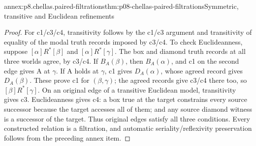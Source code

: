 \begin{annexitem}{annex:p8.chellas.paired-filtrations}{thm:p08-chellas-paired-filtrations}{Symmetric, transitive and Euclidean refinements}
\begin{proof}
For c1/c3/c4, transitivity follows by the c1/c3 argument and
transitivity of equality of the modal truth records imposed by
c3/c4. To check Euclideanness, suppose
\([\alpha]R^*[\beta]\) and \([\alpha]R^*[\gamma]\).
The box and diamond truth records at all three worlds agree, by c3/c4.
If \(B_A(\beta)\), then \(B_A(\alpha)\), and c1 on the
second edge gives A at \(\gamma\). If A holds at \(\gamma\),
c1 gives \(D_A(\alpha)\), whose agreed record gives
\(D_A(\beta)\). These prove c1 for \((\beta,\gamma)\);
the agreed records give c3/c4 there too, so
\([\beta]R^*[\gamma]\). On an original edge of a transitive
Euclidean model, transitivity gives c3. Euclideanness gives c4:
a box true at the target constrains every source successor because
the target accesses all of them; and any source diamond witness
is a successor of the target. Thus original edges satisfy all three
conditions. Every constructed relation is a filtration, and automatic
seriality/reflexivity preservation follows from the preceding annex item.
\end{proof}
\end{annexitem}

